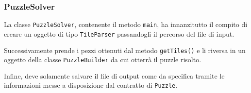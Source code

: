 \documentclass[a4paper, 12pt]{article}
\begin{document}
      \subsubsection{PuzzleSolver}

        La classe \verb|PuzzleSolver|, contenente il metodo \verb|main|, ha innanzitutto il compito di creare un oggetto di tipo \verb|TileParser| passandogli il percorso del file di input. 

        Successivamente prende i pezzi ottenuti dal metodo \verb|getTiles()| e li riversa in un oggetto della classe \verb|PuzzleBuilder| da cui otterrà il puzzle risolto.

        Infine, deve solamente salvare il file di output come da specifica tramite le informazioni messe a disposizione dal contratto di \verb|Puzzle|.
\end{document}
